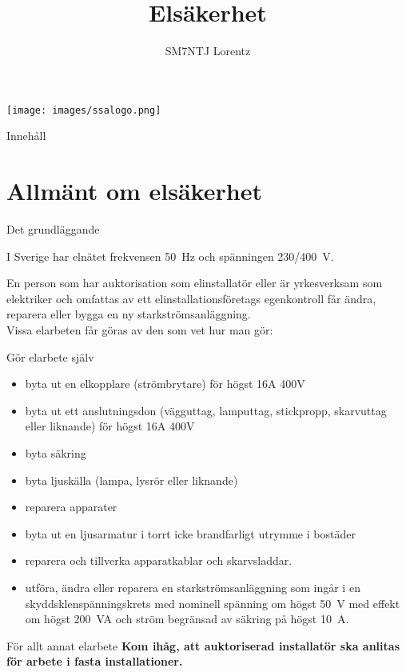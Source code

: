 \documentclass{beamer}
\title{Elsäkerhet}
\author{SM7NTJ Lorentz}
\begin{document}
\begin{frame}
\titlepage
\texttt{[image: images/ssalogo.png]}
\end{frame}

\begin{frame}{Innehåll}
\tableofcontents
\end{frame}

\section{Allmänt om elsäkerhet}

\begin{frame}{Det grundläggande}

I Sverige har elnätet frekvensen \SI{50}{\hertz} och spänningen 230/400~V.

En person som har auktorisation som elinstallatör eller är yrkesverksam som
elektriker och omfattas av ett elinstallationsföretags egenkontroll får ändra,
reparera eller bygga en ny starkströmsanläggning.\\
\vspace{5mm}
Vissa elarbeten får göras av den som vet hur man gör:
\end{frame}

\begin{frame}{Gör elarbete själv}
\begin{itemize}
	\item byta ut en elkopplare (strömbrytare) för högst 16A 400V
	\item byta ut ett anslutningsdon (vägguttag, lamputtag, stickpropp,
	skarvuttag eller liknande) för högst 16A 400V
	\item byta säkring
	\item byta ljuskälla (lampa, lysrör eller liknande)
	\item reparera apparater
	\item byta ut en ljusarmatur i torrt icke brandfarligt utrymme i bostäder
	\item reparera och tillverka apparatkablar och skarvsladdar.
	\item utföra, ändra eller reparera en starkströmsanläggning som ingår i en
	skyddsklenspänningskrets med nominell spänning om högst \SI{50}{\volt} med
    effekt om högst 200~VA och ström begränsad av säkring på högst
    \SI{10}{\ampere}.
\end{itemize}
\end{frame}

\begin{frame}{För allt annat elarbete}
\textbf{Kom ihåg, att auktoriserad installatör ska anlitas för arbete
	i fasta installationer.}
\end{frame}
\end{document}
